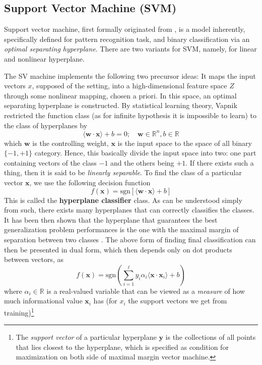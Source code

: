 \documentclass[10pt,oneside,oldfontcommands,dvipsnames,article]{memoir}
\begin{document}
\subsection{Support Vector Machine (SVM)}

Support vector machine, first formally originated from \cite{Vapnik1999-VAPTNO}, is a model inherently, specifically defined for pattern recognition task, and binary classification via an \textit{optimal separating hyperplane}. There are two variants for SVM, namely, for linear and nonlinear hyperplane. 

The SV machine implements the following two precursor ideas: It maps the input vectors $x$, supposed of the setting, into a high-dimensional feature space $Z$ through some nonlinear mapping, chosen a priori. In this space, an optimal separating hyperplane is constructed. By statistical learning theory, Vapnik restricted the function class (as for infinite hypothesis it is impossible to learn) to the class of hyperplanes by 
\begin{equation}
    \langle \mathbf{w}\cdot \mathbf{x} \rangle + b = 0 ; \quad \mathbf{w}\in \mathbb{R}^{n} , b\in \mathbb{R}
\end{equation}
which $\mathbf{w}$ is the controlling weight, $\mathbf{x}$ is the input space to the space of all binary $\{-1,+1\}$ category. Hence, this basically divide the input space into two: one part containing vectors of the class $-1$ and the others being $+1$. If there exists such a thing, then it is said to be \textit{linearly separable}. To find the class of a particular vector $\mathbf{x}$, we use the following decision function 
\begin{equation}
    f(\mathbf{x}) = \mathrm{sgn}[\langle \mathbf{w}\cdot \mathbf{x}\rangle+ b]
\end{equation}
This is called the \textbf{hyperplane classifier} class. As can be understood simply from such, there exists many hyperplanes that can correctly classifies the classes. It has been then shown that the hyperplane that guarantees the best generalization problem performances is the one with the maximal margin of separation between two classes \cite{Cristianini2000AnIT}. The above form of finding final classification can then be presented in dual form, which then depends only on dot products between vectors, as 
\begin{equation}
    f(\mathbf{x}) = \mathrm{sgn}\left(\sum^{\ell}_{i=1} y_{i}\alpha_{i} \langle \mathbf{x}\cdot \mathbf{x}_{i} \rangle+ b\right)
\end{equation} where $\alpha_{i}\in \mathbb{R}$ is a real-valued variable that can be viewed as a \textit{measure} of how much informational value $\mathbf{x}_{i}$ has (for $x_{i}$ the support vectors we get from training)\footnote{The \textit{support vector} of a particular hyperplane $\mathbf{y}$ is the collections of all points that lies closest to the hyperplane, which is specified as condition for maximization on both side of maximal margin vector machine.}
\end{document}
